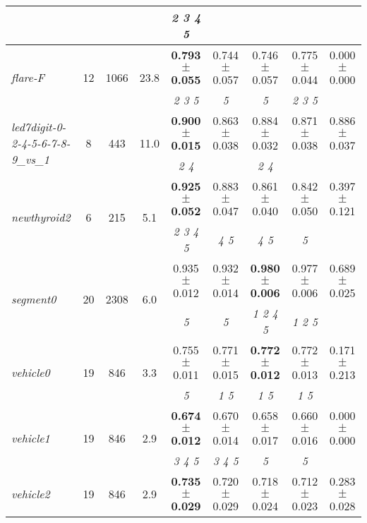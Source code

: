 \begin{table}[ht]
{\begin{tabular}{lcccccccc}
 & & &  & \textit{2 3 4 5 } & \textit{} & \textit{} & \textit{} & \textit{} \\ \bottomrule
\multirow{2}{*}{\textit{flare-F}} & \multirow{2}{*}{12} & \multirow{2}{*}{1066} & \multirow{2}{*}{23.8} & \textbf{0.793 $\pm$ 0.055} & 0.744 $\pm$ 0.057 & 0.746 $\pm$ 0.057 & 0.775 $\pm$ 0.044 & 0.000 $\pm$ 0.000 \\
 & & &  & \textit{2 3 5 } & \textit{5 } & \textit{5 } & \textit{2 3 5 } & \textit{} \\ \bottomrule
\multirow{2}{*}{\textit{led7digit-0-2-4-5-6-7-8-9\_vs\_1}} & \multirow{2}{*}{8} & \multirow{2}{*}{443} & \multirow{2}{*}{11.0} & \textbf{0.900 $\pm$ 0.015} & 0.863 $\pm$ 0.038 & 0.884 $\pm$ 0.032 & 0.871 $\pm$ 0.038 & 0.886 $\pm$ 0.037 \\
 & & &  & \textit{2 4 } & \textit{} & \textit{2 4 } & \textit{} & \textit{} \\ \bottomrule
\multirow{2}{*}{\textit{newthyroid2}} & \multirow{2}{*}{6} & \multirow{2}{*}{215} & \multirow{2}{*}{5.1} & \textbf{0.925 $\pm$ 0.052} & 0.883 $\pm$ 0.047 & 0.861 $\pm$ 0.040 & 0.842 $\pm$ 0.050 & 0.397 $\pm$ 0.121 \\
 & & &  & \textit{2 3 4 5 } & \textit{4 5 } & \textit{4 5 } & \textit{5 } & \textit{} \\ \bottomrule
\multirow{2}{*}{\textit{segment0}} & \multirow{2}{*}{20} & \multirow{2}{*}{2308} & \multirow{2}{*}{6.0} & 0.935 $\pm$ 0.012 & 0.932 $\pm$ 0.014 & \textbf{0.980 $\pm$ 0.006} & 0.977 $\pm$ 0.006 & 0.689 $\pm$ 0.025 \\
 & & &  & \textit{5 } & \textit{5 } & \textit{1 2 4 5 } & \textit{1 2 5 } & \textit{} \\ \bottomrule
\multirow{2}{*}{\textit{vehicle0}} & \multirow{2}{*}{19} & \multirow{2}{*}{846} & \multirow{2}{*}{3.3} & 0.755 $\pm$ 0.011 & 0.771 $\pm$ 0.015 & \textbf{0.772 $\pm$ 0.012} & 0.772 $\pm$ 0.013 & 0.171 $\pm$ 0.213 \\
 & & &  & \textit{5 } & \textit{1 5 } & \textit{1 5 } & \textit{1 5 } & \textit{} \\ \bottomrule
\multirow{2}{*}{\textit{vehicle1}} & \multirow{2}{*}{19} & \multirow{2}{*}{846} & \multirow{2}{*}{2.9} & \textbf{0.674 $\pm$ 0.012} & 0.670 $\pm$ 0.014 & 0.658 $\pm$ 0.017 & 0.660 $\pm$ 0.016 & 0.000 $\pm$ 0.000 \\
 & & &  & \textit{3 4 5 } & \textit{3 4 5 } & \textit{5 } & \textit{5 } & \textit{} \\ \bottomrule
\multirow{2}{*}{\textit{vehicle2}} & \multirow{2}{*}{19} & \multirow{2}{*}{846} & \multirow{2}{*}{2.9} & \textbf{0.735 $\pm$ 0.029} & 0.720 $\pm$ 0.029 & 0.718 $\pm$ 0.024 & 0.712 $\pm$ 0.023 & 0.283 $\pm$ 0.028 \\

\end{tabular}}
\end{table}

